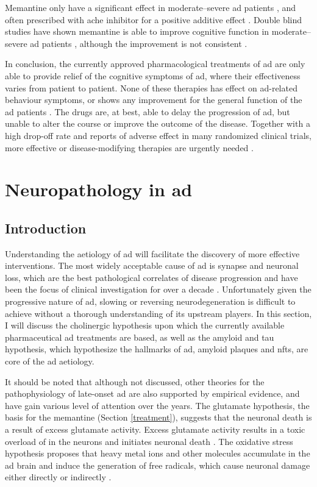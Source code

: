 Memantine only have a significant effect in moderate--severe \gls{ad} patients \citep{reisberg03, tariot04, schneider11}, and often prescribed with \gls{ache} inhibitor for a positive additive effect \citep{rountree09}. Double blind studies have shown memantine is able to improve cognitive function in moderate--severe \gls{ad} patients \citep{reisberg03, tariot04}, although the improvement is not consistent \citep{porsteinsson08}. 

In conclusion, the currently approved pharmacological treatments of \gls{ad} are only able to provide relief of the cognitive symptoms of \gls{ad}, where their effectiveness varies from patient to patient. None of these therapies has effect on \gls{ad}-related behaviour symptoms, or shows any improvement for the general function of the \gls{ad} patients \citep{tan14}. The drugs are, at best, able to delay the progression of \gls{ad}, but unable to alter the course or improve the outcome of the disease. Together with a high drop-off rate and reports of adverse effect in many randomized clinical trials, more effective or disease-modifying therapies are urgently needed \citep{bond12}. 

\section{Neuropathology in \gls{ad}}
\subsection{Introduction}

Understanding the aetiology of \gls{ad} will facilitate the discovery of more effective interventions. The most widely acceptable cause of \gls{ad} is synapse and neuronal loss, which are the best pathological correlates of disease progression and have been the focus of clinical investigation for over a decade \citep{selkoe02, coleman04}. Unfortunately given the progressive nature of \gls{ad}, slowing or reversing neurodegeneration is difficult to achieve without a thorough understanding of its upstream players. In this section, I will discuss the cholinergic hypothesis upon which the currently available pharmaceutical \gls{ad} treatments are based, as well as the amyloid and tau hypothesis, which hypothesize the hallmarks of \gls{ad}, amyloid plaques and \glspl{nft}, are core of the \gls{ad} aetiology. 

It should be noted that although not discussed, other theories for the pathophysiology of late-onset \gls{ad} are also supported by empirical evidence, and have gain various level of attention over the years. The glutamate hypothesis, the basis for the memantine (Section \ref{treatment}), suggests that the neuronal death is a result of excess glutamate activity. Excess glutamate activity results in a toxic overload of  in the neurons and initiates neuronal death \citep{greenamyre88, parsons07}. The oxidative stress hypothesis proposes that heavy metal ions and other molecules accumulate in the \gls{ad} brain and induce the generation of free radicals, which cause neuronal damage either directly or indirectly \citep{markesbery97, smith10}. 

